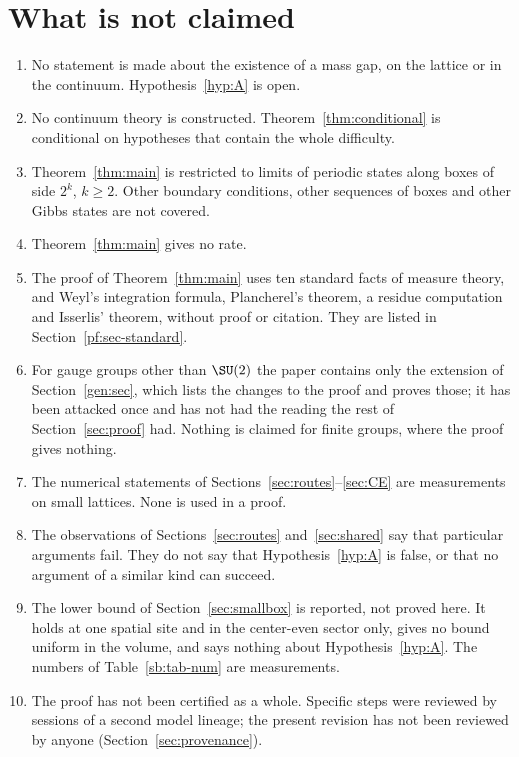 \section{What is not claimed}\label{sec:notclaimed}

\begin{enumerate}
\item No statement is made about the existence of a mass gap, on the lattice or in the continuum. Hypothesis~\ref{hyp:A} is open.
\item No continuum theory is constructed. Theorem~\ref{thm:conditional} is conditional on hypotheses that contain the whole difficulty.
\item Theorem~\ref{thm:main} is restricted to limits of periodic states along boxes of side $2^k$, $k\ge2$. Other boundary conditions, other sequences of boxes and other Gibbs states are not covered.
\item Theorem~\ref{thm:main} gives no rate.
\item The proof of Theorem~\ref{thm:main} uses ten standard facts of measure theory, and Weyl's integration formula, Plancherel's theorem, a residue computation and Isserlis' theorem, without proof or citation. They are listed in Section~\ref{pf:sec-standard}.
\item For gauge groups other than $\SU(2)$ the paper contains only the extension of Section~\ref{gen:sec}, which lists the changes to the proof and proves those; it has been attacked once and has not had the reading the rest of Section~\ref{sec:proof} had. Nothing is claimed for finite groups, where the proof gives nothing.
\item The numerical statements of Sections~\ref{sec:routes}--\ref{sec:CE} are measurements on small lattices. None is used in a proof.
\item The observations of Sections~\ref{sec:routes} and~\ref{sec:shared} say that particular arguments fail. They do not say that Hypothesis~\ref{hyp:A} is false, or that no argument of a similar kind can succeed.
\item The lower bound of Section~\ref{sec:smallbox} is reported, not proved here. It holds at one spatial site and in the center-even sector only, gives no bound uniform in the volume, and says nothing about Hypothesis~\ref{hyp:A}. The numbers of Table~\ref{sb:tab-num} are measurements.
\item The proof has not been certified as a whole. Specific steps were reviewed by sessions of a second model lineage; the present revision has not been reviewed by anyone (Section~\ref{sec:provenance}).
\end{enumerate}


